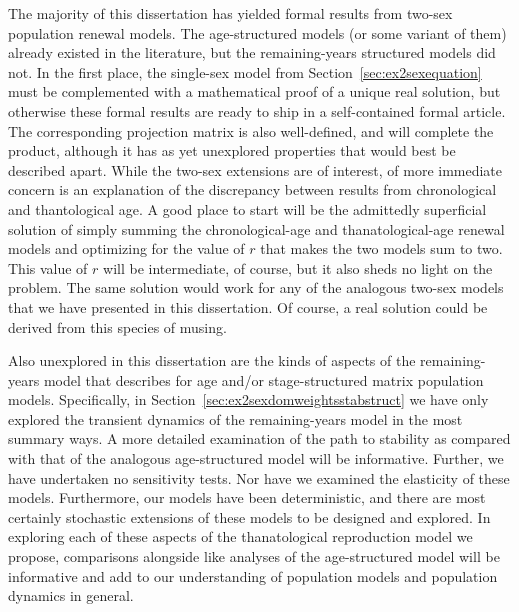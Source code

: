 The majority of this dissertation has yielded formal results from
two-sex population renewal models. The age-structured models (or some variant
of them) already existed in the literature, but the remaining-years structured
models did not. In the first place, the single-sex model from
Section~\ref{sec:ex2sexequation} must be complemented with a mathematical proof 
of a unique real solution, but otherwise these formal results are ready to ship
in a self-contained formal article. The corresponding projection matrix is also
well-defined, and will complete the product, although it has as
yet unexplored properties that would best be described apart. While the two-sex
extensions are of interest, of more immediate concern is an explanation of
the discrepancy between results from chronological and thantological age. A good
place to start will be the admittedly superficial solution of simply summing the
chronological-age and thanatological-age renewal models and optimizing for the
value of $r$ that makes the two models sum to two. This value of $r$ will be
intermediate, of course, but it also sheds no light on the problem. The same
solution would work for any of the analogous two-sex models that we have
presented in this dissertation. Of course, a real solution could be derived from
this species of musing.

Also unexplored in this dissertation are the kinds of aspects of the
remaining-years model that \citet{caswell2001matrix} describes for age and/or
stage-structured matrix population models. Specifically, in
Section~\ref{sec:ex2sexdomweightsstabstruct} we have only explored the transient 
dynamics of the remaining-years model in the most summary ways. A more detailed
examination of the path to stability as compared with that of the analogous
age-structured model will be informative. Further, we have undertaken no
sensitivity tests. Nor have we examined the elasticity of these models.
Furthermore, our models have been deterministic, and there are most certainly
stochastic extensions of these models to be designed and explored. In exploring
each of these aspects of the thanatological reproduction model we propose,
comparisons alongside like analyses of the age-structured model will be
informative and add to our understanding of population models and population
dynamics in general.





